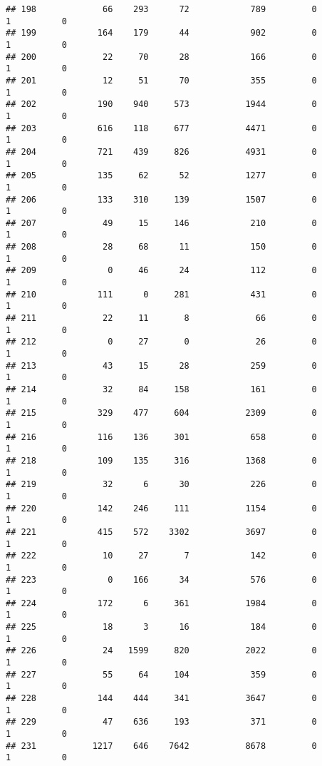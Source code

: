 \documentclass[
]{article}
\begin{document}
\begin{verbatim}
## 198             66    293      72            789         0         1          0
## 199            164    179      44            902         0         1          0
## 200             22     70      28            166         0         1          0
## 201             12     51      70            355         0         1          0
## 202            190    940     573           1944         0         1          0
## 203            616    118     677           4471         0         1          0
## 204            721    439     826           4931         0         1          0
## 205            135     62      52           1277         0         1          0
## 206            133    310     139           1507         0         1          0
## 207             49     15     146            210         0         1          0
## 208             28     68      11            150         0         1          0
## 209              0     46      24            112         0         1          0
## 210            111      0     281            431         0         1          0
## 211             22     11       8             66         0         1          0
## 212              0     27       0             26         0         1          0
## 213             43     15      28            259         0         1          0
## 214             32     84     158            161         0         1          0
## 215            329    477     604           2309         0         1          0
## 216            116    136     301            658         0         1          0
## 218            109    135     316           1368         0         1          0
## 219             32      6      30            226         0         1          0
## 220            142    246     111           1154         0         1          0
## 221            415    572    3302           3697         0         1          0
## 222             10     27       7            142         0         1          0
## 223              0    166      34            576         0         1          0
## 224            172      6     361           1984         0         1          0
## 225             18      3      16            184         0         1          0
## 226             24   1599     820           2022         0         1          0
## 227             55     64     104            359         0         1          0
## 228            144    444     341           3647         0         1          0
## 229             47    636     193            371         0         1          0
## 231           1217    646    7642           8678         0         1          0

\end{verbatim}
\end{document}
